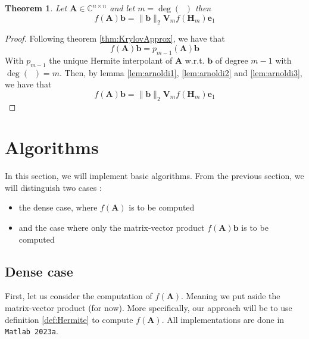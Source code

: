 \documentclass[11pt]{article}
\DeclareMathOperator{\phiAb}{\phi_{\mathbf{A},\mathbf{b}}}
\newtheorem{theorem}{Theorem}
\numberwithin{equation}{section}
\begin{document}
\begin{theorem}
    Let $\mathbf{A}\in\mathbb{C}^{n\times n}$ and let $m = \deg(\phiAb)$ then
    \begin{equation}
        f(\mathbf{A})\mathbf{b} = \|\mathbf{b}\|_2\mathbf{V}_m f(\mathbf{H}_m)\mathbf{e}_1
    \end{equation}
\end{theorem}
\begin{proof}
    Following theorem \ref{thm:KrylovApprox}, we have that
    \begin{equation*}
        f(\mathbf{A})\mathbf{b} = p_{m-1}(\mathbf{A})\mathbf{b}
    \end{equation*}
    With $p_{m-1}$ the unique Hermite interpolant of $\mathbf{A}$ w.r.t. $\mathbf{b}$ of degree $m-1$ with $\deg(\phiAb)= m$. Then, by lemma \ref{lem:arnoldi1}, \ref{lem:arnoldi2} and \ref{lem:arnoldi3}, we have that
    \begin{equation*}
        f(\mathbf{A})\mathbf{b} = \|\mathbf{b}\|_2\mathbf{V}_m f(\mathbf{H}_m)\mathbf{e}_1
    \end{equation*}
\end{proof}
\section{Algorithms}
In this section, we will implement basic algorithms. From the previous section, we will distinguish two cases : 
\begin{itemize}
    \item the dense case, where $f(\mathbf{A})$ is to be computed
    \item and the case where only the matrix-vector product $f(\mathbf{A})\mathbf{b}$ is to be computed
\end{itemize}
\subsection{Dense case}
First, let us consider the computation of $f(\mathbf{A})$. Meaning we put aside the matrix-vector product (for now). More specifically, our approach will be to use definition \ref{def:Hermite} to compute $f(\mathbf{A})$. All implementations are done in \texttt{Matlab 2023a}. 
\end{document}
